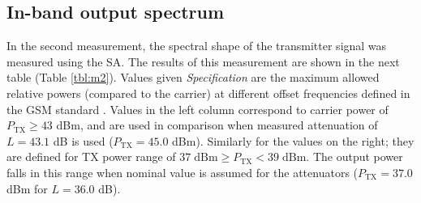 \documentclass[a4paper, 12pt]{article}
\begin{document}
\subsection{In-band output spectrum}

In the second measurement, the spectral shape of the transmitter signal was 
measured using the SA. The results of this measurement are shown in the next 
table (Table \ref{tbl:m2}). Values given \textit{Specification} are the maximum 
allowed relative powers (compared to the carrier) at different offset frequencies 
defined in the GSM standard \cite{lab1}. Values in the left column correspond 
to carrier power of $P_\mathrm{TX} \geq 43$ dBm, and are used in comparison when 
measured attenuation of $L = 43.1$ dB is used ($P_\mathrm{TX} = 45.0$ dBm). 
Similarly for the values on the right; they are defined for TX power range of
$37 \mathrm{\;dBm} \geq P_\mathrm{TX} < 39 \mathrm{\;dBm}$. The output power 
falls in this range when nominal value is assumed for the attenuators 
($P_\mathrm{TX} = 37.0$ dBm for $L = 36.0$ dB).
\end{document}

